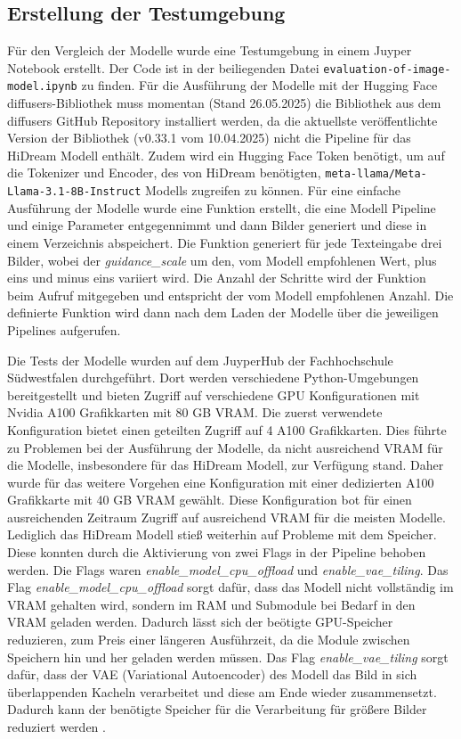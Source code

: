 \subsection{Erstellung der Testumgebung}
Für den Vergleich der Modelle wurde eine Testumgebung in einem Juyper Notebook erstellt. Der Code ist in der beiliegenden Datei \texttt{evaluation-of-image-model.ipynb} zu finden. 
Für die Ausführung der Modelle mit der Hugging Face diffusers-Bibliothek \cite{von-platen-etal-2022-diffusers} muss momentan (Stand 26.05.2025) die Bibliothek aus dem diffusers GitHub Repository installiert werden, da die aktuellste veröffentlichte Version der Bibliothek (v0.33.1 vom 10.04.2025) nicht die Pipeline für das HiDream Modell enthält. Zudem wird ein Hugging Face Token benötigt, um auf die Tokenizer und Encoder, des von HiDream benötigten, \texttt{meta-llama/Meta-Llama-3.1-8B-Instruct} Modells zugreifen zu können.
Für eine einfache Ausführung der Modelle wurde eine Funktion erstellt, die eine Modell Pipeline und einige Parameter entgegennimmt und dann Bilder generiert und diese in einem Verzeichnis abspeichert. Die Funktion generiert für jede Texteingabe drei Bilder, wobei der \emph{guidance\_scale} um den, vom Modell empfohlenen Wert, plus eins und minus eins variiert wird. Die Anzahl der Schritte wird der Funktion beim Aufruf mitgegeben und entspricht der vom Modell empfohlenen Anzahl.
Die definierte Funktion wird dann nach dem Laden der Modelle über die jeweiligen Pipelines aufgerufen.

Die Tests der Modelle wurden auf dem JuyperHub der Fachhochschule Südwestfalen durchgeführt. Dort werden verschiedene Python-Umgebungen bereitgestellt und bieten Zugriff auf verschiedene GPU Konfigurationen mit Nvidia A100 Grafikkarten mit 80 GB VRAM. Die zuerst verwendete Konfiguration bietet einen geteilten Zugriff auf 4 A100 Grafikkarten. Dies führte zu Problemen bei der Ausführung der Modelle, da nicht ausreichend VRAM für die Modelle, insbesondere für das HiDream Modell, zur Verfügung stand. Daher wurde für das weitere Vorgehen eine Konfiguration mit einer dedizierten A100 Grafikkarte mit 40 GB VRAM gewählt.
Diese Konfiguration bot für einen ausreichenden Zeitraum Zugriff auf ausreichend VRAM für die meisten Modelle. Lediglich das HiDream Modell stieß weiterhin auf Probleme mit dem Speicher. Diese konnten durch die Aktivierung von zwei Flags in der Pipeline behoben werden. Die Flags waren \emph{enable\_model\_cpu\_offload} und \emph{enable\_vae\_tiling}. Das Flag \emph{enable\_model\_cpu\_offload} sorgt dafür, dass das Modell nicht vollständig im VRAM gehalten wird, sondern im RAM und Submodule bei Bedarf in den VRAM geladen werden. Dadurch lässt sich der beötigte GPU-Speicher reduzieren, zum Preis einer längeren Ausführzeit, da die Module zwischen Speichern hin und her geladen werden müssen.
Das Flag \emph{enable\_vae\_tiling} sorgt dafür, dass der VAE (Variational Autoencoder) des Modell das Bild in sich überlappenden Kacheln verarbeitet und diese am Ende wieder zusammensetzt. Dadurch kann der benötigte Speicher für die Verarbeitung für größere Bilder reduziert werden \cite{hf-memory-optimization}.

